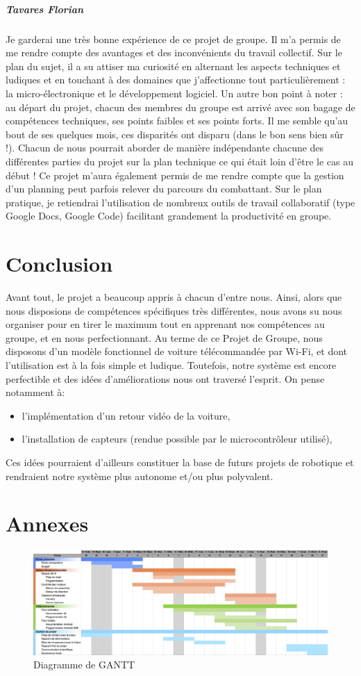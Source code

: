 \documentclass[a4paper,12pt]{report}
\begin{document}
	\paragraph{Tavares Florian}
	Je garderai une très bonne expérience de ce projet de groupe. Il m’a permis de me rendre compte des avantages et des inconvénients du travail collectif. Sur le plan du sujet, il a su attiser ma curiosité en alternant les aspects techniques et ludiques et en touchant à des domaines que j’affectionne tout particulièrement : la micro-électronique et le développement logiciel.
Un autre bon point à noter : au départ du projet, chacun des membres du groupe est arrivé avec son bagage de compétences techniques, ses points faibles et ses points forts. Il me semble qu’au bout de ses quelques mois, ces disparités ont disparu (dans le bon sens bien sûr !). Chacun de nous pourrait aborder de manière indépendante chacune des différentes parties du projet sur la plan technique ce qui était loin d’être le cas au début !
Ce projet m’aura également permis de me rendre compte que la gestion d’un planning peut parfois relever du parcours du combattant. Sur le plan pratique, je retiendrai l’utilisation de nombreux outils de travail collaboratif (type Google Docs, Google Code) facilitant grandement la productivité en groupe.
	

\chapter{Conclusion}
Avant tout, le projet a beaucoup appris à chacun d’entre nous. Ainsi, alors que nous disposions de compétences spécifiques très différentes, nous avons su nous organiser pour en tirer le maximum tout en apprenant nos compétences au groupe, et en nous perfectionnant.
Au terme de ce Projet de Groupe, nous disposons d’un modèle fonctionnel de voiture télécommandée par Wi-Fi, et dont l’utilisation est à la fois simple et ludique. Toutefois, notre système est encore perfectible et des idées d’améliorations nous ont traversé l’esprit. On pense notamment à:
\begin{itemize}
\item l’implémentation d’un retour vidéo de la voiture,
\item l’installation de capteurs (rendue possible par le microcontrôleur utilisé),
\end{itemize}

Ces idées pourraient d’ailleurs constituer la base de futurs projets de robotique et rendraient notre système plus autonome et/ou plus polyvalent.

\chapter{Annexes}

\begin{figure}
\centering
\includegraphics[scale=0.35]{images/gantt.png}
\caption{Diagramme de GANTT}
\label{gantt}
\end{figure}
\end{document}
